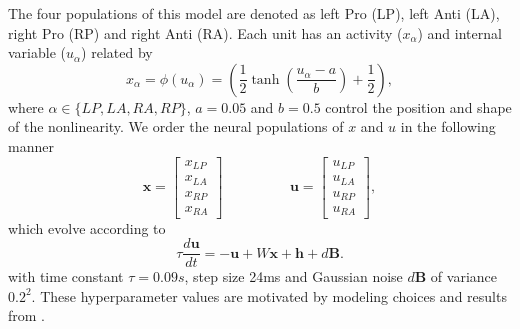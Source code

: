 \documentclass[11pt]{article}
\begin{document}
The four populations of this model are denoted as left Pro (LP), left Anti (LA), right Pro (RP) and right Anti (RA).  
Each unit has an activity ($x_\alpha$) and internal variable ($u_\alpha$) related by
\begin{equation}
x_\alpha = \phi(u_\alpha) = \left(\frac{1}{2}\tanh\left(\frac{u_\alpha - a}{b}\right)+ \frac{1}{2} \right),
\end{equation}
where $\alpha \in \{LP, LA, RA, RP\}$, $a = 0.05$ and $b = 0.5$ control the position and shape of the nonlinearity.
We order the neural populations of $x$ and $u$ in the following manner
\begin{equation}
\mathbf{x} = \begin{bmatrix} x_{LP} \\ x_{LA} \\ x_{RP} \\ x_{RA} \end{bmatrix} \hspace{2cm} \mathbf{u} = \begin{bmatrix} u_{LP} \\ u_{LA} \\ u_{RP} \\ u_{RA} \end{bmatrix},
\end{equation}
which evolve according to
\begin{equation}
\tau \frac{d\mathbf{u}}{dt} = -\mathbf{u} + W\mathbf{x} + \mathbf{h} + d\mathbf{B}.
\end{equation}
with time constant $\tau = 0.09s$, step size 24ms and Gaussian noise $d\mathbf{B}$ of variance $0.2^2$.
These hyperparameter values are motivated by modeling choices and results from \cite{duan2019collicular}.
\end{document}
